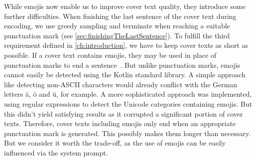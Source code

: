 While emojis now enable us to improve cover text quality, they introduce some further difficulties. When finishing the last sentence of the cover text during encoding, we use greedy sampling and terminate when reaching a suitable punctuation mark (see \cref{sec:finishingTheLastSentence}). To fulfill the third requirement defined in \cref{ch:introduction}, we have to keep cover texts as short as possible. If a cover text contains emojis, they may be used in place of punctuation marks to end a sentence~\cite{zhouGoodbyeTextHello2017}. But unlike punctuation marks, emojis cannot easily be detected using the Kotlin standard library. A simple approach like detecting non-ASCII characters would already conflict with the German letters ä, ö and ü, for example. A more sophisticated approach was implemented, using regular expressions to detect the Unicode categories containing emojis. But this didn't yield satisfying results as it corrupted a significant portion of cover texts. Therefore, cover texts including emojis only end when an appropriate punctuation mark is generated. This possibly makes them longer than necessary. But we consider it worth the trade-off, as the use of emojis can be easily influenced via the system prompt.
